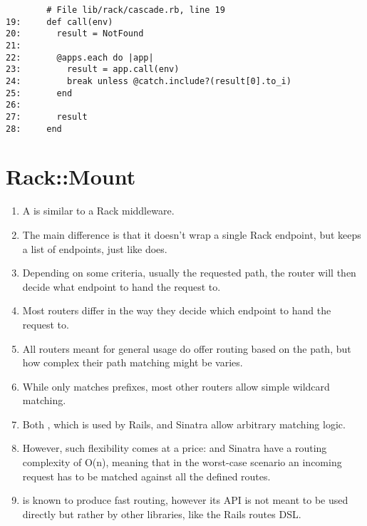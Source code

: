 
\begin{verbatim}
        # File lib/rack/cascade.rb, line 19
19:     def call(env)
20:       result = NotFound
21: 
22:       @apps.each do |app|
23:         result = app.call(env)
24:         break unless @catch.include?(result[0].to_i)
25:       end
26: 
27:       result
28:     end
\end{verbatim}

\section{Rack::Mount}

\begin{enumerate}
\item 
A  is similar to a Rack middleware. 

\item 
The main difference is
that it doesn’t wrap a single Rack endpoint, but keeps a list of
endpoints, just like \rackcascade{} does. 

\item 
Depending on some criteria,
usually the requested path, the router will then decide what endpoint
to hand the request to. 

\item 
Most routers differ in the way they decide which endpoint to hand
the request to. 

\item 
All routers meant for general usage do offer routing
based on the path, but how complex their path matching might be
varies. 


\item 
While \rackurlmap{} only matches prefixes, most other routers
allow simple wildcard matching. 

\item 
Both \rackmount{}, which is used by
Rails, and Sinatra allow arbitrary matching logic.

\item 
However, such flexibility comes at a price: \rackmount{} and Sinatra
have a routing complexity of O(n), meaning that in the worst-case
scenario an incoming request has to be matched against all the
defined routes. 

\item 
\rackmount{} is known to produce fast routing, however its API is
not meant to be used directly but rather by other libraries, like
the Rails routes DSL. 

\end{enumerate}


